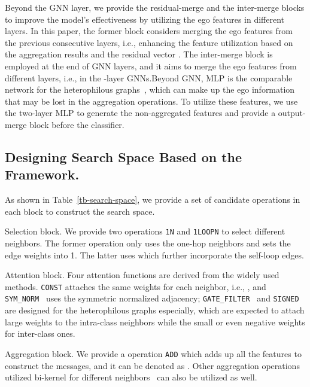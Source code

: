\documentclass[sigconf]{acmart}
\begin{document}
Beyond the GNN layer, we provide the residual-merge and the inter-merge blocks to improve the model's effectiveness by utilizing the ego features in different layers. In this paper, the former block considers merging the ego features from the previous consecutive layers, i.e., enhancing the feature utilization based on the aggregation results  and the residual vector .
The inter-merge block is employed at the end of GNN layers, and it aims to merge the ego features from different layers, i.e.,  in the -layer GNNs.Beyond GNN, MLP is the comparable network for the heterophilous graphs~\cite{ma2021homophily}, which can make up the ego information that may be lost in the aggregation operations. To utilize these features, we use the two-layer MLP to generate the non-aggregated features and provide a output-merge block before the classifier. 



\subsection{Designing Search Space Based on the Framework.}
\label{sec-search-space}
As shown in Table~\ref{tb-search-space}, we provide a set of candidate operations in each block to construct the search space.

 Selection block. We provide two operations \texttt{1N} and \texttt{1LOOPN} to select different neighbors. The former operation only uses the one-hop neighbors  and sets the edge weights into 1. The latter uses  which further incorporate the self-loop edges. 


 Attention block. Four attention functions are derived from the widely used methods.
\texttt{CONST} attaches the same weights for each neighbor, i.e., , and \texttt{SYM\_NORM}~\cite{kipf2016semi} uses the symmetric normalized adjacency;  \texttt{GATE\_FILTER}~\cite{bo2021beyond} and \texttt{SIGNED}~\cite{yan2021two} are designed for the heterophilous graphs especially, which are expected to attach large weights to the intra-class neighbors while the small or even negative weights for inter-class ones.



 Aggregation block. We provide a operation \texttt{ADD} which adds up all the features to construct the messages, and it can be denoted as . Other aggregation operations utilized bi-kernel for different neighbors~\cite{du2022gbk} can also be utilized as well. 
\end{document}
